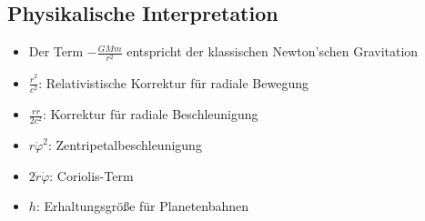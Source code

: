 \subsection*{Physikalische Interpretation}
\begin{itemize}[leftmargin=*,noitemsep]
    \item Der Term $-\frac{GMm}{r^2}$ entspricht der klassischen Newton'schen Gravitation
    \item $\frac{\dot{r}^2}{c^2}$: Relativistische Korrektur für radiale Bewegung
    \item $\frac{r\ddot{r}}{2c^2}$: Korrektur für radiale Beschleunigung
    \item $r\dot{\varphi}^2$: Zentripetalbeschleunigung
    \item $2\dot{r}\dot{\varphi}$: Coriolis-Term
    \item $h$: Erhaltungsgröße für Planetenbahnen
\end{itemize}
